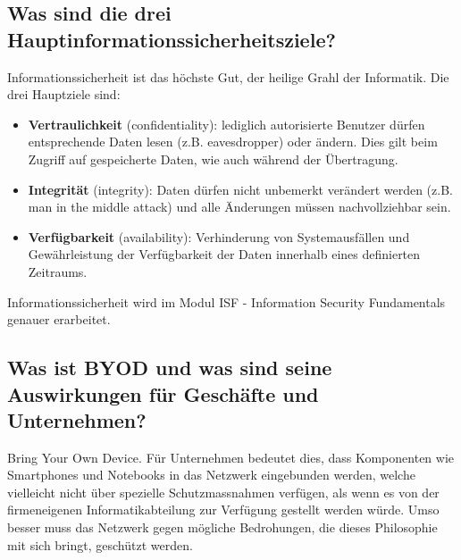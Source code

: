 \subsection*{Was sind die drei Hauptinformationssicherheitsziele?}
Informationssicherheit ist das höchste Gut, der heilige Grahl der Informatik. Die drei Hauptziele sind:
\begin{itemize}
    \item \textbf{Vertraulichkeit} (confidentiality): lediglich autorisierte Benutzer dürfen entsprechende Daten lesen (z.B. eavesdropper) oder ändern. Dies gilt beim Zugriff auf gespeicherte Daten, wie auch während der Übertragung.
    \item \textbf{Integrität} (integrity): Daten dürfen nicht unbemerkt verändert werden (z.B. man in the middle attack) und alle Änderungen müssen nachvollziehbar sein.
    \item \textbf{Verfügbarkeit} (availability): Verhinderung von Systemausfällen und Gewährleistung der Verfügbarkeit der Daten innerhalb eines definierten Zeitraums.
\end{itemize}
Informationssicherheit wird im Modul ISF - Information Security Fundamentals genauer erarbeitet.

\subsection*{Was ist \flqq BYOD\frqq{} und was sind seine Auswirkungen für Geschäfte und Unternehmen?}
Bring Your Own Device. Für Unternehmen bedeutet dies, dass Komponenten wie Smartphones und Notebooks in das Netzwerk eingebunden werden, welche vielleicht nicht über spezielle Schutzmassnahmen verfügen, als wenn es von der firmeneigenen Informatikabteilung zur Verfügung gestellt werden würde. Umso besser muss das Netzwerk gegen mögliche Bedrohungen, die dieses Philosophie mit sich bringt, geschützt werden.

